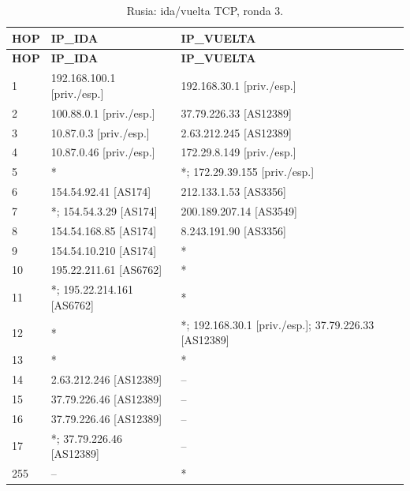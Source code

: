 \begin{longtable}{p{0.95cm}p{7.075cm}p{7.075cm}}
\caption{Rusia: ida/vuelta TCP, ronda 3.}\label{anexo:vuelta:37.79.226.46:TCP:3} \\
\toprule
\textbf{HOP} & \textbf{IP\_\allowbreak{}IDA} & \textbf{IP\_\allowbreak{}VUELTA} \\ \midrule
\endfirsthead
\toprule
\textbf{HOP} & \textbf{IP\_\allowbreak{}IDA} & \textbf{IP\_\allowbreak{}VUELTA} \\ \midrule
\endhead
1 & 192.168.100.1 [priv./esp.] & 192.168.30.1 [priv./esp.] \\
2 & 100.88.0.1 [priv./esp.] & 37.79.226.33 [AS12389] \\
3 & 10.87.0.3 [priv./esp.] & 2.63.212.245 [AS12389] \\
4 & 10.87.0.46 [priv./esp.] & 172.29.8.149 [priv./esp.] \\
5 & * & *; 172.29.39.155 [priv./esp.] \\
6 & 154.54.92.41 [AS174] & 212.133.1.53 [AS3356] \\
7 & *; 154.54.3.29 [AS174] & 200.189.207.14 [AS3549] \\
8 & 154.54.168.85 [AS174] & 8.243.191.90 [AS3356] \\
9 & 154.54.10.210 [AS174] & * \\
10 & 195.22.211.61 [AS6762] & * \\
11 & *; 195.22.214.161 [AS6762] & * \\
12 & * & *; 192.168.30.1 [priv./esp.]; 37.79.226.33 [AS12389] \\
13 & * & * \\
14 & 2.63.212.246 [AS12389] & -- \\
15 & 37.79.226.46 [AS12389] & -- \\
16 & 37.79.226.46 [AS12389] & -- \\
17 & *; 37.79.226.46 [AS12389] & -- \\
255 & -- & * \\
\bottomrule
\end{longtable}
\endgroup

